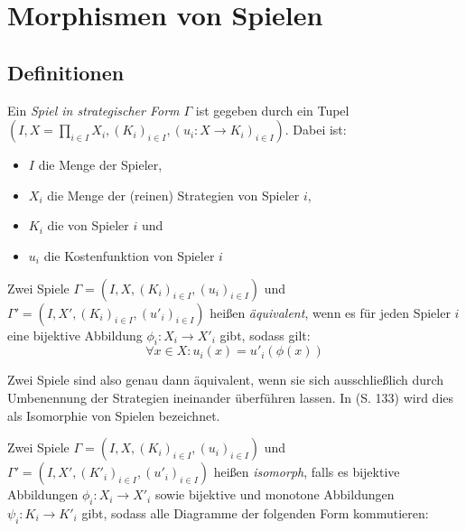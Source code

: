 \section{Morphismen von Spielen}

\subsection{Definitionen}

\begin{defn}
	Ein \emph{Spiel in strategischer Form $\Gamma$} ist gegeben durch ein Tupel $(I, X = \prod_{i \in I}X_i, (K_i)_{i\in I}, (u_i: X \to K_i)_{i\in I})$. Dabei ist:
	\begin{itemize}
		\item $I$ die Menge der Spieler,
		\item $X_i$ die Menge der (reinen) Strategien von Spieler $i$,
		\item $K_i$ die  von Spieler $i$ und
		\item $u_i$ die Kostenfunktion von Spieler $i$
	\end{itemize}
\end{defn}

\begin{defn}
	Zwei Spiele $\Gamma = (I, X, (K_i)_{i\in I}, (u_i)_{i\in I})$ und $\Gamma' = (I, X', (K_i)_{i\in I}, (u'_i)_{i\in I})$ heißen \emph{äquivalent}, wenn es für jeden Spieler $i$ eine bijektive Abbildung $\phi_i: X_i \to X'_i$ gibt, sodass gilt:
		\[\forall x \in X: u_i(x) = u'_i(\phi(x)) \]
\end{defn}

\begin{bem}
	Zwei Spiele sind also genau dann äquivalent, wenn sie sich ausschließlich durch Umbenennung der Strategien ineinander überführen lassen. In \cite{MonShap} (S. 133) wird dies als Isomorphie von Spielen bezeichnet.
\end{bem}

\begin{defn}\label{def:SpielIsomLap}
	Zwei Spiele $\Gamma = (I, X, (K_i)_{i\in I}, (u_i)_{i\in I})$ und $\Gamma' = (I, X', (K'_i)_{i\in I}, (u'_i)_{i\in I})$ heißen \emph{isomorph}, falls es bijektive Abbildungen $\phi_i: X_i \to X'_i$ sowie bijektive und monotone Abbildungen $\psi_i: K_i \to K'_i$ gibt, sodass alle Diagramme der folgenden Form kommutieren:
	
	\begin{center}
	\end{center}
\end{defn}

